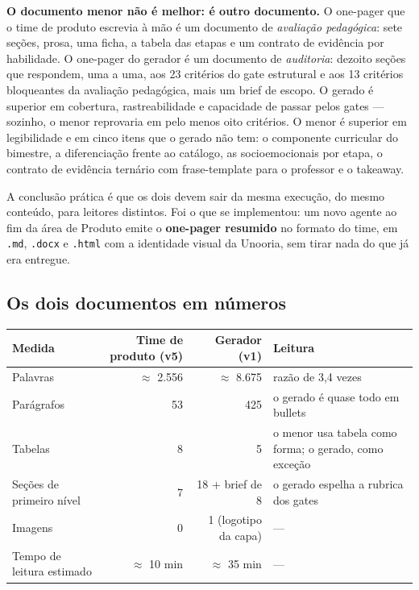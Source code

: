 \documentclass[11pt,a4paper]{article}
\newcommand{\arq}[1]{\texttt{\small #1}}
\begin{document}
\begin{tesebox}
\textbf{O documento menor não é melhor: é outro documento.} O one-pager que o time de produto escrevia à mão é um documento de \emph{avaliação pedagógica}: sete seções, prosa, uma ficha, a tabela das etapas e um contrato de evidência por habilidade. O one-pager do gerador é um documento de \emph{auditoria}: dezoito seções que respondem, uma a uma, aos 23 critérios do gate estrutural e aos 13 critérios bloqueantes da avaliação pedagógica, mais um brief de escopo. O gerado é superior em cobertura, rastreabilidade e capacidade de passar pelos gates --- sozinho, o menor reprovaria em pelo menos oito critérios. O menor é superior em legibilidade e em cinco itens que o gerado não tem: o componente curricular do bimestre, a diferenciação frente ao catálogo, as socioemocionais por etapa, o contrato de evidência ternário com frase-template para o professor e o takeaway.

A conclusão prática é que os dois devem sair da mesma execução, do mesmo conteúdo, para leitores distintos. Foi o que se implementou: um novo agente ao fim da área de Produto emite o \textbf{one-pager resumido} no formato do time, em \arq{.md}, \arq{.docx} e \arq{.html} com a identidade visual da Unooria, sem tirar nada do que já era entregue.
\end{tesebox}

\subsection{Os dois documentos em números}

\begin{table}[h]
\centering
\small
\begin{tabularx}{\textwidth}{@{}l r r X@{}}
\toprule
\textbf{Medida} & \textbf{Time de produto (v5)} & \textbf{Gerador (v1)} & \textbf{Leitura} \\
\midrule
Palavras & $\approx$ 2.556 & $\approx$ 8.675 & razão de 3,4 vezes \\
Parágrafos & 53 & 425 & o gerado é quase todo em bullets \\
Tabelas & 8 & 5 & o menor usa tabela como forma; o gerado, como exceção \\
Seções de primeiro nível & 7 & 18 + brief de 8 & o gerado espelha a rubrica dos gates \\
Imagens & 0 & 1 (logotipo da capa) & --- \\
Tempo de leitura estimado & $\approx$ 10 min & $\approx$ 35 min & --- \\
\bottomrule
\end{tabularx}
\end{table}
\end{document}
